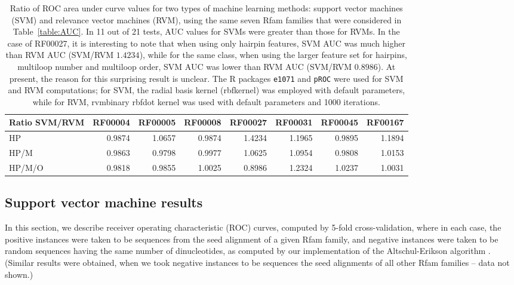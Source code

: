 \begin{table*}
\begin{tabular}{|l|rrrrrrr|}
\hline
Ratio SVM/RVM &RF00004& RF00005& RF00008& RF00027& RF00031& RF00045& RF00167\\
\hline
HP&      0.9874&  1.0657&  0.9874&  1.4234&  1.1965&  0.9895&  1.1894\\
HP/M&    0.9863&  0.9798&  0.9977&  1.0625&  1.0954&  0.9808&  1.0153\\
HP/M/O&  0.9818&  0.9855&  1.0025&  0.8986&  1.2324&  1.0237&  1.0031\\
\hline
\end{tabular}
\caption{Ratio of ROC area under curve values for two types of machine
learning methods: support vector machines (SVM) and relevance vector
machines (RVM), using the same seven Rfam families that were considered
in Table~\ref{table:AUC}. In 11 out of 21 tests, AUC values for SVMs
were greater than those for RVMs. In the case of RF00027, it is interesting
to note that when using only hairpin features, SVM AUC was much higher than
RVM AUC (SVM/RVM $1.4234$), while for the same class, when using the larger
feature set for hairpins, multiloop number and multiloop order, SVM AUC
was lower than RVM AUC (SVM/RVM $0.8986$). At present, the reason for
this surprising result is unclear.
The R packages {\tt e1071} \citep{RpackageForSVM} and {\tt pROC} \citep{pROC}
were used for SVM and RVM computations;
for SVM, the radial basis kernel (rbfkernel) was employed with
default parameters, while for RVM, rvmbinary
rbfdot kernel was used with default parameters and 1000 iterations.
}
\label{table:RF00027aucSVMversusRVM}
\end{table*}

\subsection{Support vector machine results}

In this section, we describe receiver operating characteristic
(ROC) curves, computed by 5-fold cross-validation, where in each
case, the positive instances were taken to be sequences from the
seed alignment of a given Rfam family, and negative instances were
taken to be random sequences having the same number of dinucleotides,
as computed by our implementation of the Altschul-Erikson algorithm
\citep{altschulErikson:dinucleotideShuffle}.
(Similar results were obtained, when we took negative instances to be
sequences the seed alignments of all other Rfam families -- data not
shown.)

